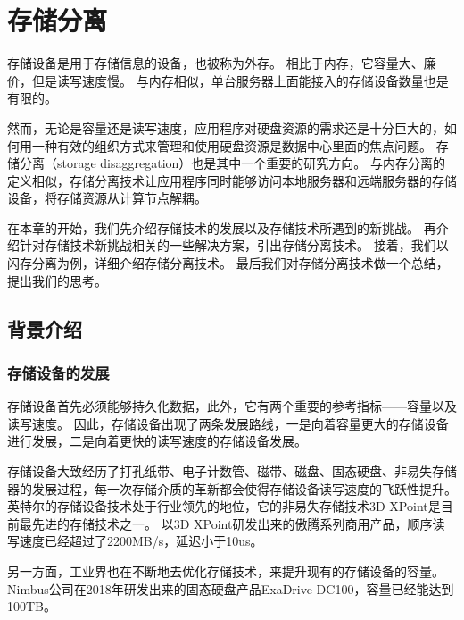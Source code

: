 
\chapter{存储分离} %

\label{Chapter3} %

存储设备是用于存储信息的设备，也被称为外存。
相比于内存，它容量大、廉价，但是读写速度慢。
与内存相似，单台服务器上面能接入的存储设备数量也是有限的。

然而，无论是容量还是读写速度，应用程序对硬盘资源的需求还是十分巨大的，如何用一种有效的组织方式来管理和使用硬盘资源是数据中心里面的焦点问题。
存储分离（storage disaggregation）也是其中一个重要的研究方向。
与内存分离的定义相似，存储分离技术让应用程序同时能够访问本地服务器和远端服务器的存储设备，将存储资源从计算节点解耦。

在本章的开始，我们先介绍存储技术的发展以及存储技术所遇到的新挑战。
再介绍针对存储技术新挑战相关的一些解决方案，引出存储分离技术。
接着，我们以闪存分离\cite{klimovic2016flash}为例，详细介绍存储分离技术。
最后我们对存储分离技术做一个总结，提出我们的思考。

\section{背景介绍}
\subsection{存储设备的发展}

存储设备首先必须能够持久化数据，此外，它有两个重要的参考指标——容量以及读写速度。
因此，存储设备出现了两条发展路线，一是向着容量更大的存储设备进行发展，二是向着更快的读写速度的存储设备发展。

存储设备大致经历了打孔纸带、电子计数管、磁带、磁盘、固态硬盘、非易失存储器的发展过程，每一次存储介质的革新都会使得存储设备读写速度的飞跃性提升。
英特尔的存储设备技术处于行业领先的地位，它的非易失存储技术3D XPoint是目前最先进的存储技术之一。
以3D XPoint研发出来的傲腾系列商用产品，顺序读写速度已经超过了2200MB/s，延迟小于10us\cite{optane}。

另一方面，工业界也在不断地去优化存储技术，来提升现有的存储设备的容量。
Nimbus公司在2018年研发出来的固态硬盘产品ExaDrive DC100，容量已经能达到100TB\cite{nimbusdata}。

